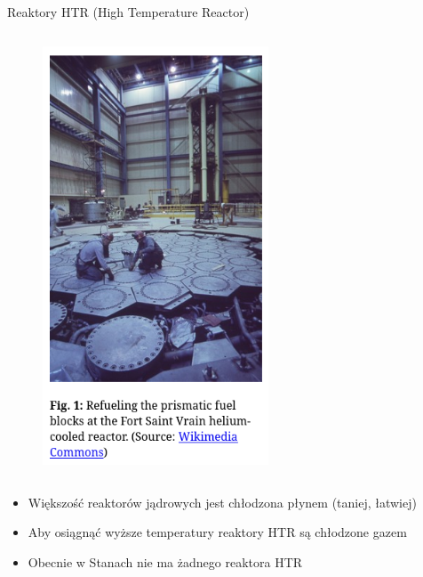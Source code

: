 \begin{columnframe}{Reaktory HTR (High Temperature Reactor)}
    \begin{column}{0.5\textwidth}
        \begin{figure}
            \centering
            \includegraphics[width=0.6\textwidth, frame]{images/ft_st_vrain_refuel.png}
        \end{figure}
    \end{column}
    \begin{column}{0.5\textwidth}
        \begin{itemize}
            \item Większość reaktorów jądrowych jest chłodzona płynem (taniej, łatwiej)
            \item Aby osiągnąć wyższe temperatury reaktory HTR są chłodzone gazem
            \item Obecnie w Stanach nie ma żadnego reaktora HTR
        \end{itemize}
    \end{column}
\end{columnframe}


